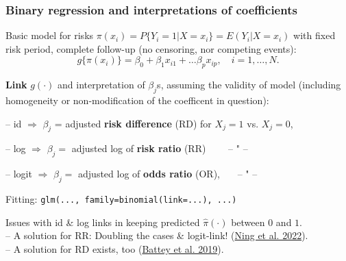 \documentclass[12pt,dvipsnames,t,handout%
,aspectratio=169%
]{beamer}
\begin{document}
\begin{frame}

\frametitle{\large Binary regression and interpretations of coefficients}

\bi
\item
Basic model for risks $\pi(x_i) = P\{Y_i=1| X=x_i\} = E(Y_i|X=x_i)$ 
with fixed risk period, complete follow-up
(no censoring, nor competing events): 
$$ g\{\pi(x_i)\} = \beta_0 + \beta_1 x_{i1} + \dots \beta_p x_{ip}, \quad i = 1, \dots, N.$$
\item
\textbf{Link} $g(\cdot)$ and interpretation of $\beta_j$s, assuming the
validity of model (including homogeneity or non-modification of the
coefficent in question):
\bi
{\normalsize 
\item[--]  id $\Rightarrow$ $\beta_j$ = 
adjusted \textbf{risk difference} (RD)  for $X_j=1$ vs. $X_j=0$,
\item[--] log $\Rightarrow$ $\beta_j=$ 
adjusted log of \textbf{risk ratio} (RR) \ \ \ \ -- " --
\item[--] logit $\Rightarrow$ $\beta_j =$ 
adjusted log of %
\textbf{odds ratio} (OR),   \ \ \ -- " -- \\
}
\ei
\medskip
\item
 Fitting: \texttt{glm(..., family=binomial(link=...), ...)}
 \medskip
\item
Issues with id \& log links in keeping predicted $\widehat\pi(\cdot)$ between $0$ and $1$. \\
-- A solution for RR: Doubling the cases \& logit-link!
 {\small (\href{https://doi.org/10.1186/s12874-022-01636-3}{\color{blue}Ning et al. 2022})}. \\
-- A solution for RD exists, too  {\small (\href{https://doi.org/10.1098/rsos.190067}{\color{blue}Battey et al. 2019})}. 
\ei
\end{frame}
\end{document}
